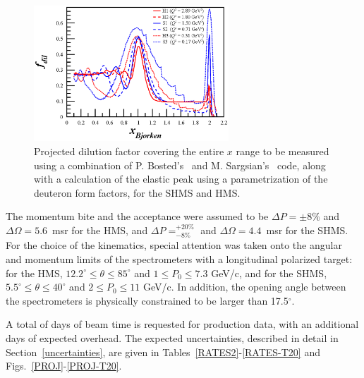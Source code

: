 \begin{figure}
\begin{center}
\includegraphics[width=0.65\textwidth]{figs/Pzz_30_fdil_all.eps} 
\caption{\label{fdil_plot}Projected dilution factor covering the entire $x$ range to be measured using a combination of P. Bosted's~\cite{Bosted:2012qc} and M. Sargsian's~\cite{misak-convo} code, along with a calculation of the elastic peak using a parametrization of the deuteron form factors, for the SHMS and HMS.}
\end{center}
\end{figure}


The momentum bite and the acceptance were assumed to be $\Delta P = \pm 8\%$ and $\Delta\Omega = 5.6$~msr for the HMS, and $\Delta P= ^{+20\%}_{-8\%}$ 
and $\Delta\Omega =4.4$~msr for the SHMS. 
%
For the choice of the kinematics,
special attention was taken onto the angular and momentum limits of the spectrometers with a longitudinal polarized target: for the
HMS, $12.2^{\circ} \le \theta \le 85^{\circ}$ and $1 \le P_0 \le 7.3$ GeV/c, and for the SHMS,
$5.5^{\circ} \le \theta \le 40^{\circ}$ and $2 \le P_0 \le 11$ GeV/c. In addition, the
opening angle between the spectrometers is physically constrained to be larger than 17.5$^{\circ}$.

A total of \productiondays days of beam time is requested for production data, with an additional \overheaddays days of expected overhead. The expected uncertainties, described in detail in Section~\ref{uncertainties}, are given in Tables~\ref{RATES2}-\ref{RATES-T20} and Figs.~\ref{PROJ}-\ref{PROJ-T20}.

